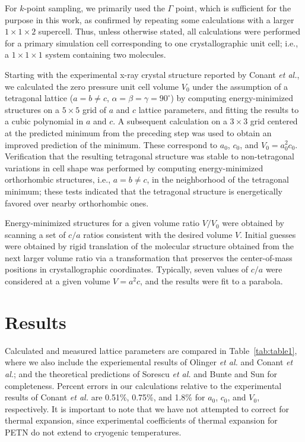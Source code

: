 \documentclass[prb,aps,nobibnotes,twocolumn,doublespace,twocolumngrid,superbib]{revtex4}
\begin{document}
For $k$-point sampling, we primarily used the $\Gamma$ point, which is 
sufficient for the purpose in this work, as confirmed by repeating some 
calculations with a larger $1 \times 1 \times 2 $ supercell.
Thus, unless otherwise stated, all calculations were performed for a
primary simulation cell corresponding to one crystallographic
unit cell; i.e., a $1\times 1\times 1 $ system containing two molecules.  

Starting with the experimental x-ray crystal structure reported by
Conant {\it et al.},\cite{Conant_1979} we calculated the zero pressure unit cell volume $V_0$ 
under the assumption of a tetragonal lattice ($a=b\neq c$, 
$\alpha=\beta=\gamma=90^\circ$) by computing energy-minimized structures
on a $5\times 5$ grid of $a$ and $c$ lattice parameters, 
and fitting  the results 
to a cubic polynomial in $a$ and $c$.  A subsequent calculation
on a $3 \times 3$ grid centered at the predicted minimum from the preceding step
was used to obtain an improved prediction of the minimum.  These
correspond to $a_0$, $c_0$, and $V_0=a_0^2c_0$.  Verification that
the resulting tetragonal structure was stable to non-tetragonal variations
in cell shape was performed by computing energy-minimized orthorhombic
structures, i.e., $a=b\neq c$, in the neighborhood of the tetragonal minimum; 
these tests indicated that the tetragonal structure is energetically favored 
over nearby orthorhombic ones.  

Energy-minimized structures for a given volume ratio $V/V_0$ 
were obtained by scanning a set of $c/a$ ratios consistent with the 
desired volume $V$.  Initial guesses were obtained by rigid translation 
of the molecular structure obtained from the next larger volume ratio 
via a transformation that preserves the center-of-mass positions in 
crystallographic coordinates.  Typically, seven values of
$c/a$ were considered at a given volume $V=a^2c$, and the results were
fit to a parabola.

\section{Results}
\label{sec:results}
Calculated and measured lattice parameters are compared in 
Table~\ref{tab:table1}, where
we also include the experiemental results of Olinger {\it et al.}\cite{Olinger_1975v62} and Conant {\it et al.}\cite{Conant_1979}; 
and the theoretical predictions of Sorescu {\it et al.}\cite{Sorescu_1999v103}  and
Bunte and Sun\cite{Bunte_2000v104}  for completeness.  Percent errors in 
our calculations 
relative to the experimental results of Conant {\it et al.}\cite{Conant_1979} are 0.51\%, 0.75\%, 
and 1.8\% for $a_0$, $c_0$, and $V_0$, respectively.  It is important to note 
that we have not attempted to correct for thermal expansion, since 
experimental coefficients of thermal expansion for PETN do not extend to 
cryogenic temperatures. 
\end{document}
